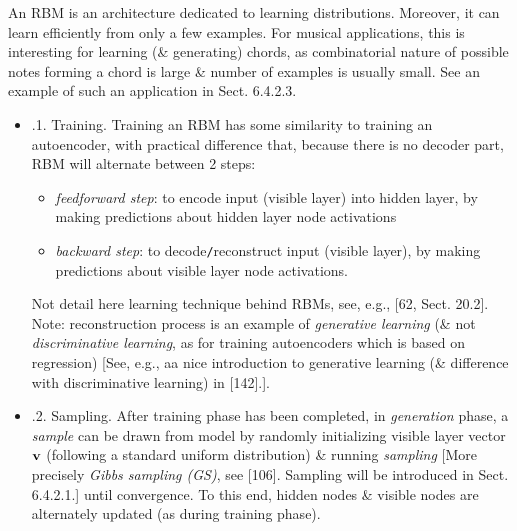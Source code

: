 \documentclass{article}
\begin{document}
\begin{itemize}
\begin{itemize}
		An RBM is an architecture dedicated to learning distributions. Moreover, it can learn efficiently from only a few examples. For musical applications, this is interesting for learning (\& generating) chords, as combinatorial nature of possible notes forming a chord is large \& number of examples is usually small. See an example of such an application in Sect. 6.4.2.3.
		\begin{itemize}
			\item {.1. Training.} Training an RBM has some similarity to training an autoencoder, with practical difference that, because there is no decoder part, RBM will alternate between 2 steps:
			\begin{itemize}
				\item {\it feedforward step}: to encode input (visible layer) into hidden layer, by making predictions about hidden layer node activations
				\item {\it backward step}: to decode{\tt/}reconstruct input (visible layer), by making predictions about visible layer node activations.
			\end{itemize}
			Not detail here learning technique behind RBMs, see, e.g., [62, Sect. 20.2]. Note: reconstruction process is an example of {\it generative learning} (\& not {\it discriminative learning}, as for training autoencoders which is based on regression) [See, e.g., aa nice introduction to generative learning (\& difference with discriminative learning) in [142].].
			\item {.2. Sampling.} After training phase has been completed, in {\it generation} phase, a {\it sample} can be drawn from model by randomly initializing visible layer vector ${\bf v}$ (following a standard uniform distribution) \& running {\it sampling} [More precisely {\it Gibbs sampling (GS)}, see [106]. Sampling will be introduced in Sect. 6.4.2.1.] until convergence. To this end, hidden nodes \& visible nodes are alternately updated (as during training phase).
			

\end{itemize}
\end{itemize}
\end{itemize}
\end{document}
